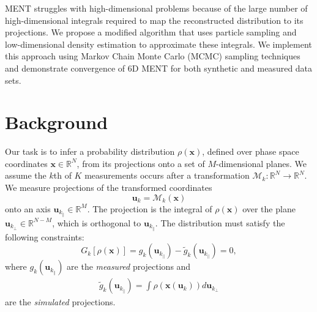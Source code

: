 \documentclass[%
    reprint,
    twocolumn,
    amsmath,
    amssymb,
    aps,
    prstab,
]{revtex4-2}
\begin{document}
MENT struggles with high-dimensional problems because of the large number of high-dimensional integrals required to map the reconstructed distribution to its projections. We propose a modified algorithm that uses particle sampling and low-dimensional density estimation to approximate these integrals. We implement this approach using Markov Chain Monte Carlo (MCMC) sampling techniques and demonstrate convergence of 6D MENT for both synthetic and measured data sets.


\section{Background}\label{sec:background}

Our task is to infer a probability distribution $\rho(\bm{x})$, defined over phase space coordinates $\bm{x} \in \mathbb{R}^N$, from its projections onto a set of $M$-dimensional planes. We assume the $k$th of $K$ measurements occurs after a transformation $\mathcal{M}_k: \mathbb{R}^N \rightarrow \mathbb{R}^N$. We measure projections of the transformed coordinates
%
\begin{equation} \label{eq:forward}
    \bm{u}_k = \mathcal{M}_k(\bm{x})
\end{equation}
%
onto an axis $\bm{u}_{k_\parallel} \in \mathbb{R}^M$. The projection is the integral of $\rho(\bm{x})$ over the plane $\bm{u}_{k_\perp} \in \mathbb{R}^{N - M}$, which is orthogonal to $\bm{u}_{k_\parallel}$. The distribution must satisfy the following constraints:
%
\begin{equation} \label{eq:constraints}
    G_k \left[ {\rho}(\bm{x}) \right] 
    = g_k(\bm{u}_{k_\parallel}) - \tilde{g}_k(\bm{u}_{k_\parallel})
    = 0,
\end{equation}
%
where ${g}_k(\bm{u}_{k_\parallel})$ are the \textit{measured} projections and
%
\begin{equation} \label{eq:simulated-projections}
\begin{aligned}
    \tilde{g}_k(\bm{u}_{k_\parallel}) 
    =
    \int {\rho} ( \bm{x}(\bm{u}_k) ) d\bm{u}_{k_\perp}
\end{aligned}
\end{equation}
%
are the \textit{simulated} projections.
\end{document}
